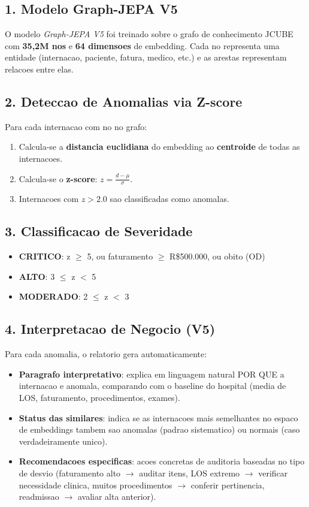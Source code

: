 \documentclass[a4paper,10pt]{article}
\begin{document}
\subsection*{1. Modelo Graph-JEPA V5}
O modelo \textit{Graph-JEPA V5} foi treinado sobre o grafo de conhecimento JCUBE com \textbf{35,2M nos}
e \textbf{64 dimensoes} de embedding. Cada no representa uma entidade (internacao, paciente,
fatura, medico, etc.) e as arestas representam relacoes entre elas.

\subsection*{2. Deteccao de Anomalias via Z-score}
Para cada internacao com no no grafo:
\begin{enumerate}[nosep]
  \item Calcula-se a \textbf{distancia euclidiana} do embedding ao \textbf{centroide} de todas as internacoes.
  \item Calcula-se o \textbf{z-score}: $z = \frac{d - \mu}{\sigma}$.
  \item Internacoes com $z > 2.0$ sao classificadas como anomalas.
\end{enumerate}

\subsection*{3. Classificacao de Severidade}
\begin{itemize}[nosep]
  \item \textcolor{anomred}{\textbf{CRITICO}}: z $\geq$ 5, ou faturamento $\geq$ R\$500.000, ou obito (OD)
  \item \textcolor{anomorange}{\textbf{ALTO}}: 3 $\leq$ z $<$ 5
  \item \textcolor{anomyellow}{\textbf{MODERADO}}: 2 $\leq$ z $<$ 3
\end{itemize}

\subsection*{4. Interpretacao de Negocio (V5)}
Para cada anomalia, o relatorio gera automaticamente:
\begin{itemize}[nosep]
  \item \textbf{Paragrafo interpretativo}: explica em linguagem natural POR QUE a internacao e anomala,
    comparando com o baseline do hospital (media de LOS, faturamento, procedimentos, exames).
  \item \textbf{Status das similares}: indica se as internacoes mais semelhantes no espaco de embeddings
    tambem sao anomalas (padrao sistematico) ou normais (caso verdadeiramente unico).
  \item \textbf{Recomendacoes especificas}: acoes concretas de auditoria baseadas no tipo de desvio
    (faturamento alto $\rightarrow$ auditar itens, LOS extremo $\rightarrow$ verificar necessidade clinica,
    muitos procedimentos $\rightarrow$ conferir pertinencia, readmissao $\rightarrow$ avaliar alta anterior).
\end{itemize}
\end{document}
